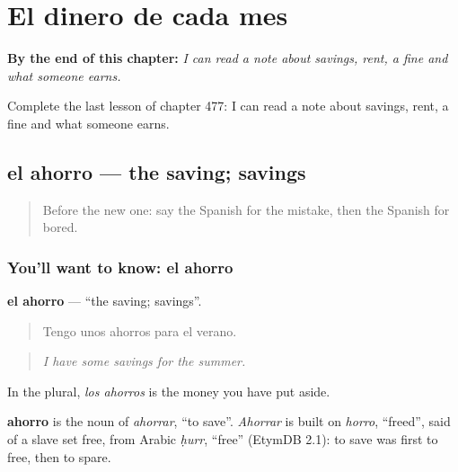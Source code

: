 
\chapter{El dinero de cada mes}
\label{ch:es-el-dinero-de-cada-mes}

\begin{chapteropening}
\textbf{By the end of this chapter:} \emph{I can read a note about savings, rent, a fine and what someone earns.}

Complete the last lesson of chapter 477: I can read a note about savings, rent, a fine and what someone earns.
\end{chapteropening}

\section[el ahorro]{el ahorro — the saving; savings}

\label{lesson:ES-C477-ahorro}



\begin{quote}
Before the new one: say the Spanish for the mistake, then the Spanish for bored.
\end{quote}

\subsection*{You'll want to know: el ahorro}
\textbf{el ahorro} — \textquotedblleft{}the saving; savings\textquotedblright{}.

\begin{quote}
Tengo unos ahorros para el verano.
\end{quote}

\begin{quote}
\emph{I have some savings for the summer.}
\end{quote}

In the plural, \emph{los ahorros} is the money you have put aside.

\begin{cousinweb}
\textbf{ahorro} is the noun of \emph{ahorrar}, \textquotedblleft{}to save\textquotedblright{}. \emph{Ahorrar} is built on \emph{horro}, \textquotedblleft{}freed\textquotedblright{}, said of a slave set free, from Arabic \emph{ḥurr}, \textquotedblleft{}free\textquotedblright{} (EtymDB 2.1): to save was first to free, then to spare.
\end{cousinweb}

